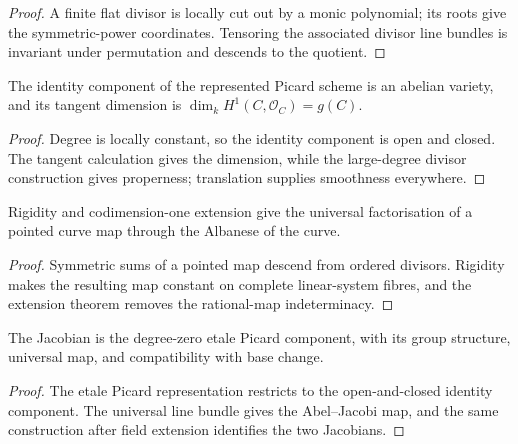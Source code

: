 \begin{proof}
  A finite flat divisor is locally cut out by a monic polynomial; its roots
  give the symmetric-power coordinates.  Tensoring the associated divisor
  line bundles is invariant under permutation and descends to the quotient.
\end{proof}

\begin{proposition}
  \label{pa-app-pic0-interface}
  \cite{kleiman-picard}
  The identity component of the represented Picard scheme is an abelian
  variety, and its tangent dimension is \(\dim_k H^1(C,\mathcal O_C)=g(C)\).
\end{proposition}

\begin{proof}
  Degree is locally constant, so the identity component is open and closed.
  The tangent calculation gives the dimension, while the large-degree divisor
  construction gives properness; translation supplies smoothness everywhere.
\end{proof}

\begin{theorem}
  \label{pa-app-albanese-interface}
  \cite{milne-av,mumford-av}
  Rigidity and codimension-one extension give the universal factorisation of a
  pointed curve map through the Albanese of the curve.
\end{theorem}

\begin{proof}
  Symmetric sums of a pointed map descend from ordered divisors.  Rigidity
  makes the resulting map constant on complete linear-system fibres, and the
  extension theorem removes the rational-map indeterminacy.
\end{proof}

\begin{theorem}
  \label{pa-app-jacobian-interface}
  \cite{kleiman-picard}
  The Jacobian is the degree-zero etale Picard component, with its group
  structure, universal map, and compatibility with base change.
\end{theorem}

\begin{proof}
  The etale Picard representation restricts to the open-and-closed identity
  component.  The universal line bundle gives the Abel--Jacobi map, and the
  same construction after field extension identifies the two Jacobians.
\end{proof}
